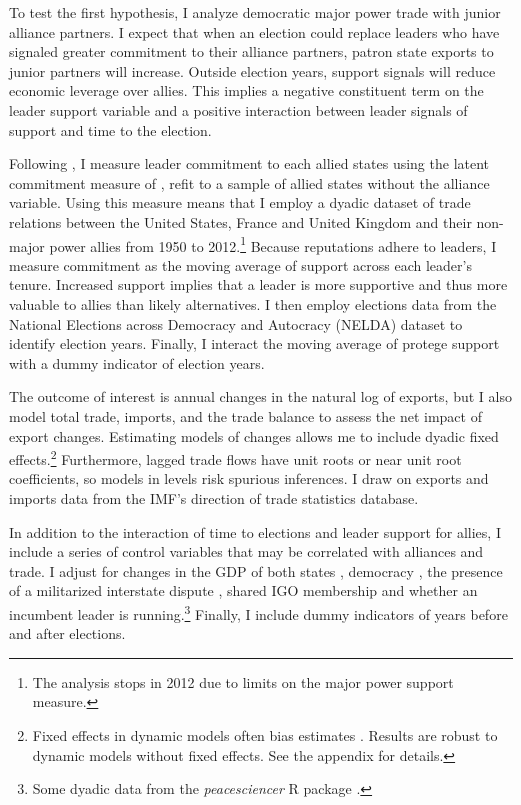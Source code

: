 \documentclass[12pt]{article}
\begin{document}
To test the first hypothesis, I analyze democratic major power trade with junior alliance partners. 
I expect that when an election could replace leaders who have signaled greater commitment to their alliance partners, patron state exports to junior partners will increase.
Outside election years, support signals will reduce economic leverage over allies.
This implies a negative constituent term on the leader support variable and a positive interaction between leader signals of support and time to the election.


Following \citep{DigiuseppeShea2021}, I measure leader commitment to each allied states using the latent commitment measure of \citet{McManusNieman2019}, refit to a sample of allied states without the alliance variable. 
Using this measure means that I employ a dyadic dataset of trade relations between the United States, France and United Kingdom and their non-major power allies from 1950 to 2012.\footnote{The analysis stops in 2012 due to limits on the major power support measure.}
Because reputations adhere to leaders, I measure commitment as the moving average of support across each leader's tenure. 
Increased support implies that a leader is more supportive and thus more valuable to allies than likely alternatives.
I then employ elections data from the National Elections across Democracy and Autocracy (NELDA) dataset \citep{HydeMarinov2012} to identify election years.
Finally, I interact the moving average of protege support with a dummy indicator of election years.


The outcome of interest is annual changes in the natural log of exports, but I also model total trade, imports, and the trade balance to assess the net impact of export changes.
Estimating models of changes allows me to include dyadic fixed effects.\footnote{Fixed effects in dynamic models often bias estimates \citep{Nickell1981}. Results are robust to dynamic models without fixed effects. See the appendix for details.}
Furthermore, lagged trade flows have unit roots or near unit root coefficients, so models in levels risk spurious inferences.
I draw on exports and imports data from the IMF's direction of trade statistics database.


In addition to the interaction of time to elections and leader support for allies, I include a series of control variables that may be correlated with alliances and trade. 
I adjust for changes in the GDP of both states \citep{FouquinHugot2016}, democracy \citep{Marquez2016}, the presence of a militarized interstate dispute \citep{Gibleretal2016}, shared IGO membership \citep{Pevehouseetal2020} and whether an incumbent leader is running.\footnote{Some dyadic data from the \textit{peacesciencer} \textsf{R} package \citep{peacesciencer-package}.}
Finally, I include dummy indicators of years before and after elections.
\end{document}
